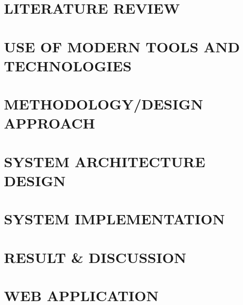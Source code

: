 \documentclass[12pt,a4paper]{report}
\begin{document}
\chapter{LITERATURE REVIEW}


\chapter{USE OF MODERN TOOLS AND TECHNOLOGIES}


\chapter{METHODOLOGY/DESIGN APPROACH}


\chapter{SYSTEM ARCHITECTURE DESIGN}


\chapter{SYSTEM IMPLEMENTATION}


\chapter{RESULT \& DISCUSSION}


\chapter{WEB APPLICATION}


\end{document}
